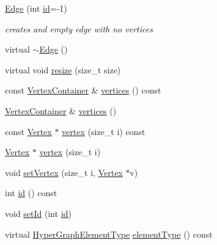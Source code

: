 \begin{DoxyCompactItemize}
\item 
\hyperlink{classg2o_1_1HyperGraph_1_1Edge_a891618b34652837ef0bee7084db81f2e}{Edge} (int \hyperlink{classg2o_1_1HyperGraph_1_1Edge_a397a7fb12379b2c48b5e6bc4c6c71fc0}{id}=-\/1)
\begin{DoxyCompactList}\small\item\em creates and empty edge with no vertices \end{DoxyCompactList}\item 
virtual \hyperlink{classg2o_1_1HyperGraph_1_1Edge_a202cb31558caef5a7bf18a49281173a3}{$\sim$\+Edge} ()
\item 
virtual void \hyperlink{classg2o_1_1HyperGraph_1_1Edge_ad8913f1149a0fd5bb628f0f1c8a91a55}{resize} (size\+\_\+t size)
\item 
const \hyperlink{classg2o_1_1HyperGraph_a9339534c99300a0ddac87ba976ef188c}{Vertex\+Container} \& \hyperlink{classg2o_1_1HyperGraph_1_1Edge_a6410bb70a917b5407770ef1f1090b5f5}{vertices} () const 
\item 
\hyperlink{classg2o_1_1HyperGraph_a9339534c99300a0ddac87ba976ef188c}{Vertex\+Container} \& \hyperlink{classg2o_1_1HyperGraph_1_1Edge_a67d1c5cb557deab9e9e361c63359fe60}{vertices} ()
\item 
const \hyperlink{classg2o_1_1HyperGraph_1_1Vertex}{Vertex} $\ast$ \hyperlink{classg2o_1_1HyperGraph_1_1Edge_aaec0b2c92c5496d0f0fea8f1abdc4311}{vertex} (size\+\_\+t i) const 
\item 
\hyperlink{classg2o_1_1HyperGraph_1_1Vertex}{Vertex} $\ast$ \hyperlink{classg2o_1_1HyperGraph_1_1Edge_af544d5d17d900c5aa2b5c9219d8e716f}{vertex} (size\+\_\+t i)
\item 
void \hyperlink{classg2o_1_1HyperGraph_1_1Edge_a5e957658d6e65c49b81197d052a7f16f}{set\+Vertex} (size\+\_\+t i, \hyperlink{classg2o_1_1HyperGraph_1_1Vertex}{Vertex} $\ast$v)
\item 
int \hyperlink{classg2o_1_1HyperGraph_1_1Edge_a397a7fb12379b2c48b5e6bc4c6c71fc0}{id} () const 
\item 
void \hyperlink{classg2o_1_1HyperGraph_1_1Edge_a1270ed91efa5f7a0fc42229356cc23e1}{set\+Id} (int \hyperlink{classg2o_1_1HyperGraph_1_1Edge_a397a7fb12379b2c48b5e6bc4c6c71fc0}{id})
\item 
virtual \hyperlink{classg2o_1_1HyperGraph_af603119d5d3475aed6e34ee9d701b69e}{Hyper\+Graph\+Element\+Type} \hyperlink{classg2o_1_1HyperGraph_1_1Edge_a73df6169b3669d48f86eef90de0fcc26}{element\+Type} () const 
\end{DoxyCompactItemize}
